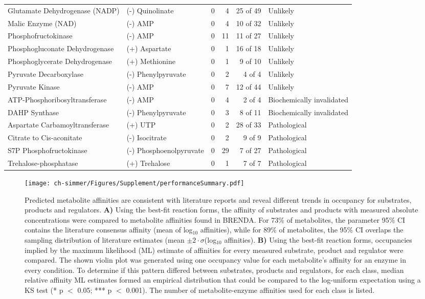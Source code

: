 \begin{singlespace}
\begin{sidewaystable}
\begin{tabular}{|l l || r r| r l|}
Glutamate Dehydrogenase (NADP)&(-) Quinolinate&0&4&25 of 49&Unlikely\\
Malic Enzyme (NAD)&(-) AMP&0&4&10 of 32&Unlikely\\
Phosphofructokinase&(-) AMP&0&11&11 of 27&Unlikely\\
Phosphogluconate Dehydrogenase&(+) Aspartate&0&1&16 of 18&Unlikely\\
Phosphoglycerate Dehydrogenase&(+) Methionine&0&1&9 of 10&Unlikely\\
Pyruvate Decarboxylase&(-) Phenylpyruvate&0&2&4 of 4&Unlikely\\
Pyruvate Kinase&(-) AMP&0&7&12 of 44&Unlikely\\
ATP-Phosphoribosyltransferase&(-) AMP&0&4&2 of 4&Biochemically invalidated\\
DAHP Synthase&(-) Phenylpyruvate&0&3&8 of 11&Biochemically invalidated\\
Aspartate Carbamoyltransferase&(+) UTP&0&2&28 of 33&Pathological\\
Citrate to Cis-aconitate&(-) Isocitrate&0&2&9 of 9&Pathological\\
S7P Phosphofructokinase&(-) Phosphoenolpyruvate&0&29&7 of 27&Pathological\\
Trehalose-phosphatase&(+) Trehalose&0&1&7 of 7&Pathological\\\hline
\end{tabular}
\end{sidewaystable}
\end{singlespace}

\begin{figure}[H]
\texttt{[image: ch-simmer/Figures/Supplement/performanceSummary.pdf]}
\caption[Predicted metabolite affinities are consistent with literature reports and reveal different trends in occupancy for substrates, products and regulators]{Predicted metabolite affinities are consistent with literature reports and reveal different trends in occupancy for substrates, products and regulators. \textbf{A)} Using the best-fit reaction forms, the affinity of substrates and products with measured absolute concentrations were compared to metabolite affinities found in BRENDA.  For 73\% of metabolites, the parameter 95\% CI contains the literature consensus affinity (mean of log$_{10}$ affinities), while for 89\% of metabolites, the 95\% CI overlaps the sampling distribution of literature estimates (mean $\pm 2 \cdot \sigma$(log$_{10}$ affinities). \textbf{B)} Using the best-fit reaction forms, occupancies implied by the maximum likelihood (ML) estimate of affinities for every measured substrate, product and regulator were compared. The shown violin plot was generated using one occupancy value for each metabolite's affinity for an enzyme in every condition.  To determine if this pattern differed between substrates, products and regulators, for each class, median relative affinity ML estimates formed an empirical distribution that could be compared to the log-uniform expectation using a KS test (* p $<$ 0.05; *** p $<$ 0.001). The number of metabolite-enzyme affinities used for each class is listed.}
\label{fig:occupancy}
\end{figure}


